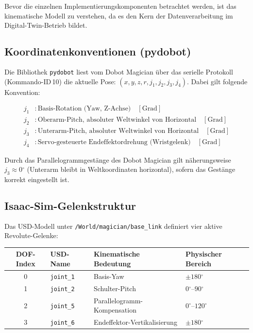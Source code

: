 \documentclass[11pt,a4paper]{article}
\begin{document}
Bevor die einzelnen Implementierungskomponenten betrachtet werden,
ist das kinematische Modell zu verstehen, da es den Kern der
Datenverarbeitung im Digital-Twin-Betrieb bildet.

\subsection{Koordinatenkonventionen (pydobot)}

Die Bibliothek \texttt{pydobot} liest vom Dobot Magician über das
serielle Protokoll (Kommando-ID\,10) die aktuelle Pose:
$(x, y, z, r, j_1, j_2, j_3, j_4)$.
Dabei gilt folgende Konvention:

\begin{align}
  j_1 &: \text{Basis-Rotation (Yaw, Z-Achse)} \quad [\text{Grad}] \\
  j_2 &: \text{Oberarm-Pitch, absoluter Weltwinkel von Horizontal}
          \quad [\text{Grad}] \\
  j_3 &: \text{Unterarm-Pitch, absoluter Weltwinkel von Horizontal}
          \quad [\text{Grad}] \\
  j_4 &: \text{Servo-gesteuerte Endeffektordrehung (Wristgelenk)}
          \quad [\text{Grad}]
\end{align}

\begin{notebox}
Durch das Parallelogrammgestänge des Dobot Magician gilt
näherungsweise $j_3 \approx 0{{}^\circ}$ (Unterarm bleibt in
Weltkoordinaten horizontal), sofern das Gestänge korrekt eingestellt ist.
\end{notebox}

\subsection{Isaac-Sim-Gelenkstruktur}

Das USD-Modell unter \texttt{/World/magician/base\_link} definiert
vier aktive Revolute-Gelenke:

\begin{center}
\begin{tabular}{clll}
  \toprule
  DOF-Index & USD-Name & Kinematische Bedeutung & Physischer Bereich \\
  \midrule
  0 & \texttt{joint\_1} & Basis-Yaw & $\pm 180{{}^\circ}$ \\
  1 & \texttt{joint\_2} & Schulter-Pitch & $0{{}^\circ}$--$90{{}^\circ}$ \\
  2 & \texttt{joint\_5} & Parallelogramm-Kompensation & $0{{}^\circ}$--$120{{}^\circ}$ \\
  3 & \texttt{joint\_6} & Endeffektor-Vertikalisierung & $\pm 180{{}^\circ}$ \\
  \bottomrule
\end{tabular}
\end{center}
\end{document}

